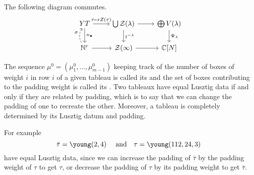 \documentclass[draft]{article} %
\begin{document}
% 
The following diagram commutes.
\[
\begin{tikzcd}
   YT  \ar[r,"\tau\mapsto Z(\tau)"] \ar[d,"n_\bullet"] & \bigcup\cZ(\lambda) \ar[r] \ar[d, "t^{-\lambda}"] & \bigoplus V(\lambda) \ar[d, "\Psi_\lambda"] \\ 
    \NN^{r} \ar[r] \ar[u,dashed,bend left,"\sigma"] & \cZ(\infty) \ar[r] & \CC[N] %
\end{tikzcd}
\]



The 
sequence $\mu^0 = (\mu^0_1,\dots,\mu^0_{m-1})$ keeping track of the number 
of boxes of weight $i$ in row $i$ of a given tableau is called its  and the set of boxes contributing to the padding weight is called its . 
Two tableaux have equal Lusztig data if and only if they are related by padding, which is to say that we can change the padding of one to recreate the other. Moreover, a tableau is completely determined by its Lusztig datum and padding.

For example 
$$\bar \tau = \young(2,4) \quad \text{ and} \quad \tau = \young(112,24,3)$$ 
have equal Lusztig data, since we can increase the padding of $\bar\tau$
by the padding weight of $\tau$ to get $\tau$, or decrease the padding of $\tau$ by its padding weight 
to get $\bar\tau$.
\end{document}
